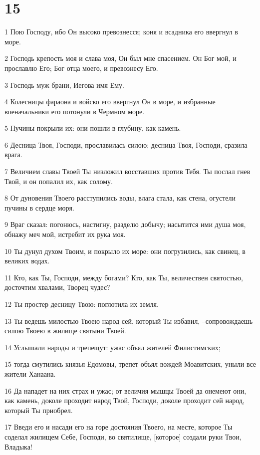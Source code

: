 \chapter{15}

\par 1 Пою Господу, ибо Он высоко превознесся; коня и всадника его ввергнул в море.
\par 2 Господь крепость моя и слава моя, Он был мне спасением. Он Бог мой, и прославлю Его; Бог отца моего, и превознесу Его.
\par 3 Господь муж брани, Иегова имя Ему.
\par 4 Колесницы фараона и войско его ввергнул Он в море, и избранные военачальники его потонули в Чермном море.
\par 5 Пучины покрыли их: они пошли в глубину, как камень.
\par 6 Десница Твоя, Господи, прославилась силою; десница Твоя, Господи, сразила врага.
\par 7 Величием славы Твоей Ты низложил восставших против Тебя. Ты послал гнев Твой, и он попалил их, как солому.
\par 8 От дуновения Твоего расступились воды, влага стала, как стена, огустели пучины в сердце моря.
\par 9 Враг сказал: погонюсь, настигну, разделю добычу; насытится ими душа моя, обнажу меч мой, истребит их рука моя.
\par 10 Ты дунул духом Твоим, и покрыло их море: они погрузились, как свинец, в великих водах.
\par 11 Кто, как Ты, Господи, между богами? Кто, как Ты, величествен святостью, досточтим хвалами, Творец чудес?
\par 12 Ты простер десницу Твою: поглотила их земля.
\par 13 Ты ведешь милостью Твоею народ сей, который Ты избавил, --сопровождаешь силою Твоею в жилище святыни Твоей.
\par 14 Услышали народы и трепещут: ужас объял жителей Филистимских;
\par 15 тогда смутились князья Едомовы, трепет объял вождей Моавитских, уныли все жители Ханаана.
\par 16 Да нападет на них страх и ужас; от величия мышцы Твоей да онемеют они, как камень, доколе проходит народ Твой, Господи, доколе проходит сей народ, который Ты приобрел.
\par 17 Введи его и насади его на горе достояния Твоего, на месте, которое Ты соделал жилищем Себе, Господи, во святилище, [которое] создали руки Твои, Владыка!
